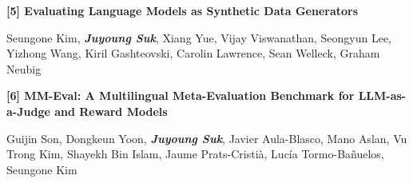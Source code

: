 \vspace{0.2 cm}
\begin{onecolentry}{}
\textbf{[5] Evaluating Language Models as Synthetic Data Generators}
\end{onecolentry}
\vspace{0.10 cm}
\begin{onecolentry}
Seungone Kim, \textbf{\textit{Juyoung Suk}}, Xiang Yue, Vijay Viswanathan, Seongyun Lee, Yizhong Wang, Kiril Gashteovski, Carolin Lawrence, Sean Welleck, Graham Neubig
\vspace{0.10 cm}
\end{onecolentry}



\vspace{0.2 cm}
\begin{onecolentry}{}
\textbf{[6] MM-Eval: A Multilingual Meta-Evaluation Benchmark for LLM-as-a-Judge and Reward Models}
\end{onecolentry}
\vspace{0.10 cm}
\begin{onecolentry}
Guijin Son, Dongkeun Yoon, \textbf{\textit{Juyoung Suk}}, Javier Aula-Blasco, Mano Aslan, Vu Trong Kim, Shayekh Bin Islam, Jaume Prats-Cristià, Lucía Tormo-Bañuelos, Seungone Kim
\vspace{0.10 cm}
\end{onecolentry}
